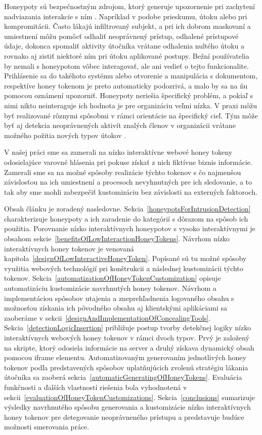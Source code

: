 \documentclass[conference, 11pt,slovak,a4paper,twoside]{IEEEtran}
\begin{document}
Honeypoty sú bezpečnostným zdrojom, ktorý generuje upozornenie pri zachytení nadviazania interakcie s ním \cite{sanders_intrusion_2020}. Napríklad v podobe prieskumu, útoku alebo pri kompromitácii. Často lákajú infiltrovaný subjekt, a pri ich dobrom maskovaní a umiestnení môžu pomôcť odhaliť neoprávnený prístup, odhalené prístupové údaje, dokonca spomaliť aktivity útočníka vrátane odhalenia nultého útoku a rovnako aj zistiť niektoré ním pri útoku aplikované postupy. Bežní používatelia by nemali s honeypotom vôbec interagovať, ale ani vedieť o tejto funkcionalite. Prihlásenie sa do takéhoto systému alebo otvorenie a manipulácia s dokumentom, respektíve honey tokenom \cite{ng_honeypot_2018} je preto automaticky podozrivá, a malo by sa na ňu pomocou oznámení upozorniť. Honeypoty neriešia špecifický problém, a pokiaľ s nimi nikto neinteraguje ich hodnota je pre organizáciu veľmi nízka. V praxi môžu byť realizované rôznymi spôsobmi v rámci orientácie na špecifický cieľ. Tým môže byť aj detekcia neoprávnených aktivít znalých členov v organizácii vrátane možného požitia nových typov útokov \cite{spitzner_honeypots_2003}.

V našej práci sme sa zamerali na nízko interaktívne webové honey tokeny odosielajúce varovné hlásenia pri pokuse získať z nich fiktívne biznis informácie. Zamerali sme sa na možné spôsoby realizácie týchto tokenov s čo najmenšou závislosťou na ich umiestnení a procesoch nevyhnutných pre ich sledovanie, a to tak aby sme mohli zabezpečiť kustomizáciu bez závislosti na externých faktoroch.

Obsah článku je zoradený nasledovne. Sekcia~\ref{honeypotsForIntrusionDetection} charakterizuje honeypoty a ich zaradenie do kategórií s dôrazom na spôsob ich použitia. Porovnanie nízko interaktívnych honeypotov s vysoko interaktívnymi je obsahom sekcie~\ref{benefitsOfLowInteractionHoneyTokens}. Návrhom nízko interaktívnych honey tokenov je venovaná kapitola~\ref{designOfLowInteractiveHoneyToken}. Popísané sú tu možné spôsoby využitia webových technológií pri konštrukcii a následnej kustomizácii týchto tokenov. Sekcia~\ref{automatizationOfHoneyTokenCustomization} opisuje automatizáciu kustomizácie navrhnutých honey tokenov.  Návrhom a implementáciou spôsobov utajenia a zneprehľadnenia logovaného obsahu s možnosťou získania ich pôvodného obsahu aj klientskými aplikáciami sa zaoberáme v sekcii~\ref{designAndImplementationOfConcealingTools}. Sekcia~\ref{detectionLogicInsertion} približuje postup tvorby detekčnej logiky nízko interaktívnych webových honey tokenov v rámci dvoch typov. Prvý je založený na skripte, ktorý odosiela informácie na server a druhý získava dynamický obsah pomocou iframe elementu. Automatizovaným generovaním jednotlivých honey tokenov podľa predstavených spôsobov uplatňujúcich zvolenú stratégiu lákania útočníka sa zaoberá sekcia~\ref{automaticGeneratingOfHoneyTokens}. Evaluácia funkčnosti a ďalších vlastností riešenia bola vyhodnotená v sekcii~\ref{evaluationOfHoneyTokenCustomizations}. Sekcia~\ref{conclusions} sumarizuje výsledky navrhnutého spôsobu generovania a kustomizácie nízko interaktívnych honey tokenov pre detegovanie neoprávneného prístupu a predstavuje budúce možnosti smerovania práce.
\end{document}
